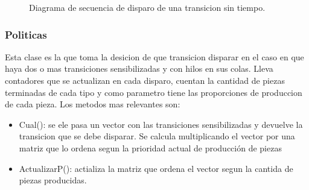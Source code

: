 \documentclass[10pt, a4paper,notitlepage]{article}
\begin{document}
\begin{figure}[H] %
	\caption{Diagrama de secuencia de disparo de una transicion sin tiempo.}
	\label{fig:sec}
\end{figure}

\subsubsection{Politicas}
Esta clase es la que toma la desicion de que transicion disparar en el caso en que haya dos o mas transiciones sensibilizadas y con hilos en sus colas. Lleva contadores que se actualizan en cada disparo, cuentan la cantidad de piezas terminadas de cada tipo y como parametro tiene las proporciones de produccion de cada pieza. Los metodos mas relevantes son:
\begin{itemize}
	\item Cual(): se ele pasa un vector con las transiciones sensibilizadas y devuelve la transicion que se debe disparar. Se calcula multiplicando el vector por una matriz que lo ordena segun la prioridad actual de producción de piezas
	\item ActualizarP(): actializa la matriz que ordena el vector segun la cantida de piezas producidas.
\end{itemize}
\end{document}
